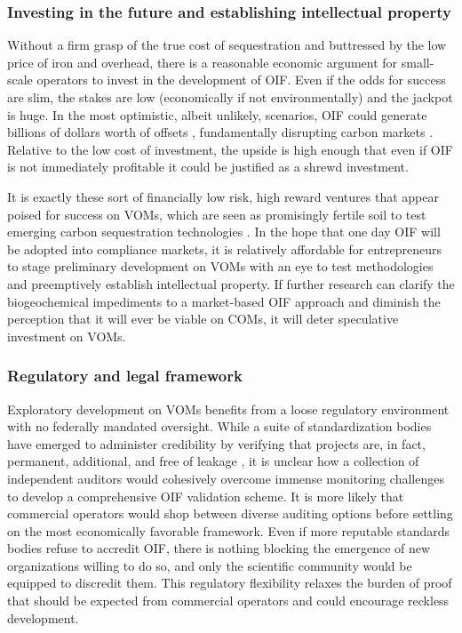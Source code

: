 \subsubsection{Investing in the future and establishing intellectual property}

Without a firm grasp of the true cost of sequestration and buttressed by the low price of iron and overhead, there is a reasonable economic argument for small-scale operators to invest in the development of OIF. Even if the odds for success are slim, the stakes are low (economically if not environmentally) and the jackpot is huge. In the most optimistic, albeit unlikely, scenarios, OIF could generate billions of dollars worth of offsets \parencite{CullenPredictingverifyingintended2008}, fundamentally disrupting carbon markets \parencite{NeeffMarketMethodologiesMeet2007}. Relative to the low cost of investment, the upside is high enough that even if OIF is not immediately profitable it could be justified as a shrewd investment. 

It is exactly these sort of financially low risk, high reward ventures that appear poised for success on VOMs, which are seen as promisingly fertile soil to test emerging carbon sequestration technologies \parencite{HamrickUnlockingPotentialState2017, HamrickRaisingAmbitionState2016}. In the hope that one day OIF will be adopted into compliance markets, it is relatively affordable for entrepreneurs to stage preliminary development on VOMs with an eye to test methodologies and preemptively establish intellectual property. If further research can clarify the biogeochemical impediments to a market-based OIF approach and diminish the perception that it will ever be viable on COMs, it will deter speculative investment on VOMs. 


\subsubsection{Regulatory and legal framework}

Exploratory development on VOMs benefits from a loose regulatory environment with no federally mandated oversight. While a suite of standardization bodies have emerged to administer credibility by verifying that projects are, in fact, permanent, additional, and free of leakage \parencite{HamrickUnlockingPotentialState2017}, it is unclear how a collection of independent auditors would cohesively overcome immense monitoring challenges to develop a comprehensive OIF validation scheme. It is more likely that commercial operators would shop between diverse auditing options before settling on the most economically favorable framework. Even if more reputable standards bodies refuse to accredit OIF, there is nothing blocking the emergence of new organizations willing to do so, and only the scientific community would be equipped to discredit them. This regulatory flexibility relaxes the burden of proof that should be expected from commercial operators and could encourage reckless development.  

